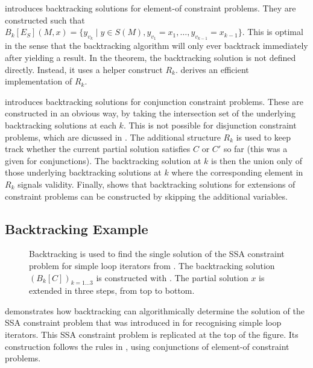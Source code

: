      introduces backtracking solutions for element-of
    constraint problems.
    They are constructed such that
    $B_k[E_S](M,x)=\{y_{v_k}\mid y\in S(M), y_{v_1}=x_1,\dots,y_{v_{k-1}}=x_{k-1}\}$.
    This is optimal in the sense that the backtracking algorithm will only ever
    backtrack immediately after yielding a result.
    In the theorem, the backtracking solution is not defined directly.
    Instead, it uses a helper construct $R_k$.
     derives an efficient implementation of $R_k$.

     introduces backtracking solutions for conjunction
    constraint problems.
    These are constructed in an obvious way, by taking the intersection set of
    the underlying backtracking solutions at each $k$.
    This is not possible for disjunction constraint problems, which are dicussed
    in .
    The additional structure $R_k$ is used to keep track whether the current
    partial solution satisfies $C$ or $C'$ so far
    (this was a given for conjunctions).
    The backtracking solution at $k$ is then the union only of those underlying
    backtracking solutions at $k$ where the corresponding element in $R_k$
    signals validity.
    Finally,  shows that backtracking solutions for extensions
    of constraint problems can be constructed by skipping the
    additional variables.

\subsection{Backtracking Example}

\begin{figure}[p]
    
    \caption{Backtracking is used to find the single solution of the
             SSA constraint problem for simple loop iterators from
             .
             The backtracking solution $(B_k[C])_{k=1\dots3}$ is constructed
             with .
             The partial solution $x$  is extended in three steps, from top to
             bottom.}
    \label{fig:backtracsol}
\end{figure}

     demonstrates how backtracking can algorithmically
    determine the solution of the SSA constraint problem that was introduced in
     for recognising simple loop iterators.
    This SSA constraint problem is replicated at the top of the figure.
    Its construction follows the rules in
    , using conjunctions
    of element-of constraint problems.

